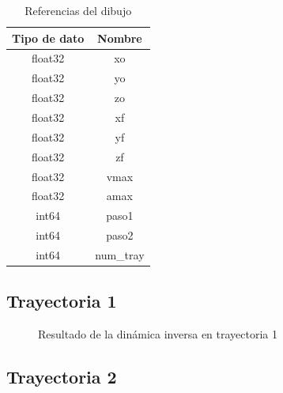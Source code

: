             \begingroup
            \renewcommand{\arraystretch}{1.0}
            \begin{table}[H]
                \centering
                \begin{tabular}{c c}
                   \hline                   \hline
                   \textbf{Tipo de dato}  & \textbf{Nombre}    \\\hline \hline 
                    float32 & xo
                   \\\hline
                    float32 & yo
                   \\\hline
                    float32 & zo
                   \\\hline
                    float32 & xf
                   \\\hline
                    float32 & yf
                   \\\hline
                    float32 & zf
                   \\\hline
                    float32 & vmax
                   \\\hline
                    float32 & amax
                   \\\hline
                    int64 & paso1
                   \\\hline
                    int64 & paso2
                   \\\hline
                    int64 & num\_tray
                    \\\hline                   \hline
                \end{tabular}
                \caption{Referencias del dibujo}
                \label{tab:cap6_rviz_5_msg}
            \end{table}
        \endgroup   
        \newpage

    \subsection{Trayectoria 1}
    
        \begin{figure}[h]
            \centering
            
            \caption{Resultado de la dinámica inversa en trayectoria 1}
            \label{f:cap7_tray1}
        \end{figure}

                
    \subsection{Trayectoria 2}
    
